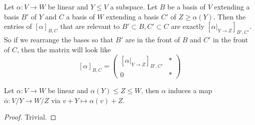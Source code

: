 \begin{example}
    Let $\alpha:V\to W$ be linear and $Y\le V$ a subspace.
    Let $B$ be a basis of $V$ extending a basis $B'$ of $Y$ and $C$ a basis of $W$ extending a basis $C'$ of $Z\ge\alpha(Y)$.
    Then the entries of $[\alpha]_{B,C}$ that are relevant to $B'\subset B,C'\subset C$ are exactly $[\alpha|_{Y\to Z}]_{B',C'}$.
    So if we rearrange the bases so that $B'$ are in the front of $B$ and $C'$ in the front of $C$, then the matrix will look like
    $$[\alpha]_{B,C}=\left(\begin{array}{c|c}
        [\alpha|_{Y\to Z}]_{B',C'}&\ast\\
        \hline
        0&\ast
    \end{array}\right)$$
\end{example}
\begin{proposition}
    Let $\alpha:V\to W$ be linear and $\alpha(Y)\le Z\le W$, then $\alpha$ induces a map $\bar\alpha:V/Y\to W/Z$ via $v+Y\mapsto\alpha(v)+Z$.
\end{proposition}
\begin{proof}
    Trivial.
\end{proof}